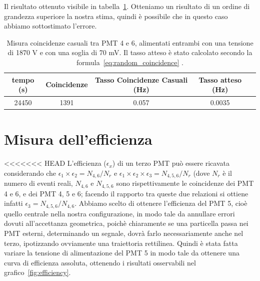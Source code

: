 \documentclass[a4paper,10pt]{article}
\begin{document}
Il risultato ottenuto visibile in tabella~\ref{tab:random_coincidence_mesured}. Otteniamo un risultato di un ordine di grandezza superiore la nostra stima, quindi è possibile che in questo caso abbiamo sottostimato l'errore. 

\begin{table}
\centering
\begin{tabular}{|c|c|c|c|c|}
\hline 
tempo (s) & Coincidenze & Tasso Coincidenze Casuali (Hz) & Tasso atteso (Hz) \\ 
\hline 
24450 & 1391 & 0.057 & 0.0035\\ 
\hline 
\end{tabular} 
\caption{Misura coincidenze casuali tra PMT 4 e 6, alimentati entrambi con una tensione di 1870 V e con una soglia di 70 mV. Il tasso atteso è stato calcolato secondo la formula~\ref{eq:random_coincidence} .}
\label{tab:random_coincidence_mesured}
\end{table}

\section{Misura dell'efficienza}
<<<<<<< HEAD
L'efficienza ($\epsilon_x$) di un terzo PMT può essere ricavata considerando che $\epsilon_1\times \epsilon_2=N_{4,6}/N_r$ e $\epsilon_1\times \epsilon_2\times \epsilon_3=N_{4,5,6}/N_r$ (dove $N_r$ è il numero di eventi reali, $N_{4,6}$ e $N_{4,5,6}$ sono rispettivamente le coincidenze dei PMT 4 e 6, e dei PMT 4, 5 e 6; facendo il rapporto tra queste due relazioni si ottiene infatti $\epsilon_3=N_{4,5,6}/N_{4,6}$. Abbiamo scelto di ottenere l'efficienza del PMT 5, cioè quello centrale nella nostra configurazione, in modo tale da annullare errori dovuti all'accettanza geometrica, poichè chiaramente se una particella passa nei PMT esterni, determinando un segnale, dovrà farlo necessariamente anche nel terzo, ipotizzando ovviamente una traiettoria rettilinea. Quindi è stata fatta variare la tensione di alimentazione del PMT 5 in modo tale da ottenere una curva di efficienza assoluta, ottenendo i risultati osservabili nel grafico~\ref{fig:efficiency}.
\end{document}
